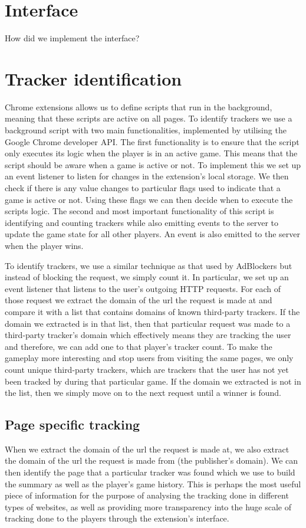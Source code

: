 \documentclass{l4proj}
\begin{document}
\section{Interface}
How did we implement the interface?

\section{Tracker identification}
Chrome extensions allows us to define scripts that run in the background, meaning that these scripts are active on all pages. To identify trackers we use a background script with two main functionalities, implemented by utilising the Google Chrome developer API. The first functionality is to ensure that the script only executes its logic when the player is in an active game. This means that the script should be aware when a game is active or not. To implement this we set up an event listener to listen for changes in the extension's local storage. We then check if there is any value changes to particular flags used to indicate that a game is active or not. Using these flags we can then decide when to execute the scripts logic. The second and most important functionality of this script is identifying and counting trackers while also emitting events to the server to update the game state for all other players. An event is also emitted to the server when the player wins. 

To identify trackers, we use a similar technique as that used by AdBlockers but instead of blocking the request, we simply count it. In particular, we set up an event listener that listens to the user's outgoing HTTP requests. For each of those request we extract the domain of the url the request is made at and compare it with a list that contains domains of known third-party trackers. If the domain we extracted is in that list, then that particular request was made to a third-party tracker's domain which effectively means they are tracking the user and therefore, we can add one to that player's tracker count. To make the gameplay more interesting and stop users from visiting the same pages, we only count unique third-party trackers, which are trackers that the user has not yet been tracked by during that particular game. If the domain we extracted is not in the list, then we simply move on to the next request until a winner is found.

\subsection{Page specific tracking}
When we extract the domain of the url the request is made at, we also extract the domain of the url the request is made from (the publisher's domain). We can then identify the page that a particular tracker was found which we use to build the summary as well as the player's game history. This is perhaps the most useful piece of information for the purpose of analysing the tracking done in different types of websites, as well as providing more transparency into the huge scale of tracking done to the players through the extension's interface.
\end{document}
